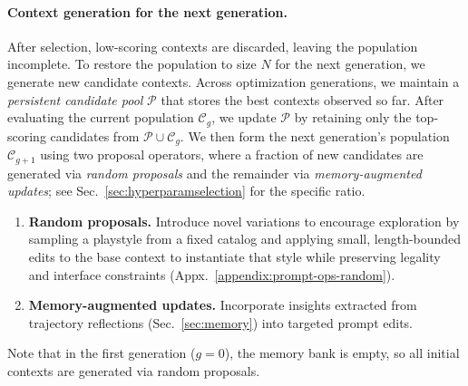 \paragraph{Context generation for the next generation.}

After selection, low-scoring contexts are discarded, leaving the population incomplete. To restore the population to size $N$ for the next generation, we generate new candidate contexts. Across optimization generations, we maintain a \emph{persistent candidate pool} $\mathcal{P}$ that stores the best contexts observed so far. After evaluating the current population $\mathcal{C}_g$, we update $\mathcal{P}$ by retaining only the top-scoring candidates from $\mathcal{P}\cup\mathcal{C}_g$. We then form the next generation's population $\mathcal{C}_{g+1}$ using two proposal operators, where a fraction of new candidates are generated via \textit{random proposals} and the remainder via \textit{memory-augmented updates}; see Sec.~\ref{sec:hyperparamselection} for the specific ratio.


\begin{enumerate}[leftmargin=1.5em, labelindent=0pt, labelsep=0.5em,topsep=1pt, itemsep=1pt] \item \textbf{Random proposals.} Introduce novel variations to encourage exploration by sampling a playstyle from a fixed catalog and applying small, length-bounded edits to the base context to instantiate that style while preserving legality and interface constraints (Appx.~\ref{appendix:prompt-ops-random}). \item \textbf{Memory-augmented updates.} Incorporate insights extracted from trajectory reflections (Sec.~\ref{sec:memory}) into targeted prompt edits. \end{enumerate} Note that in the first generation ($g=0$), the memory bank is empty, so all initial contexts are generated via random proposals. 

